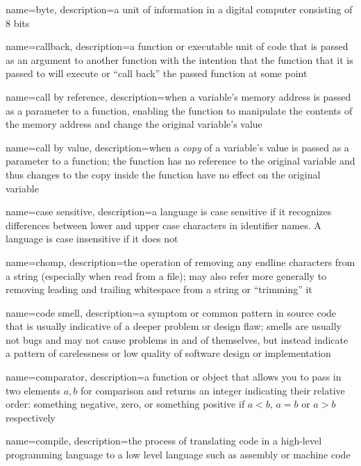 {
  name=byte,
  description={a unit of information in a digital computer consisting of 8 bits}
}

{
  name=callback,
  description={a function or executable unit of code that is passed as an argument to another function with the intention that the function that it is passed to will execute or ``call back'' the passed function at some point}
}

{
  name=call by reference,
  description={when a variable's memory address is passed as a parameter to a function, enabling the function to manipulate the contents of the memory address and change the original variable's value}
}

{
  name=call by value,
  description={when a \emph{copy} of a variable's value is passed as a parameter to a function; the function has no reference to the original variable and thus changes to the copy inside the function have no effect on the original variable}
}

{
  name=case sensitive,
  description={a language is case sensitive if it recognizes differences between lower and upper case characters in 
  	identifier names.  A language is case insensitive if it does not}
}

{
  name=chomp,
  description={the operation of removing any endline characters from a string (especially when read from a file); may also refer more generally to removing leading and trailing whitespace from a string or ``trimming'' it}
}

{
  name=code smell,
  description={a symptom or common pattern in source code that is usually indicative of a deeper problem or design flaw; smells are usually not bugs and may not cause problems in and of themselves, but instead indicate a pattern of carelessness or low quality of software design or implementation}
}

{
  name=comparator,
  description={a function or object that allows you to pass in two elements $a, b$ for comparison and returns an integer indicating their relative order: something negative, zero, or something positive if $a < b$, $a = b$ or $a > b$ respectively}
}

{
  name=compile,
  description={the process of translating code in a high-level programming language to a low level language such as assembly or machine code}
}

